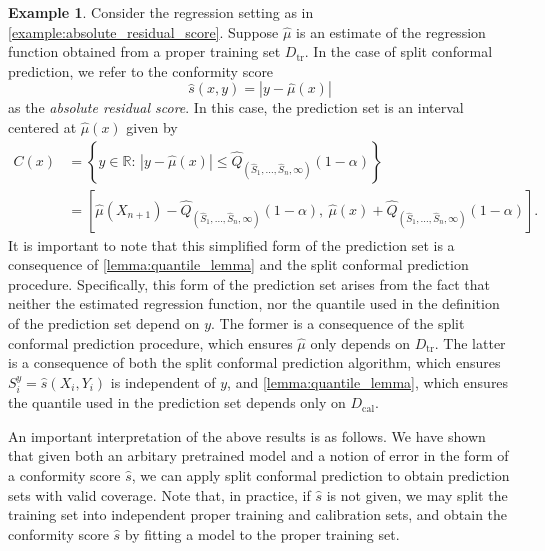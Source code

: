 \documentclass[11pt, titlepage]{article} %
\numberwithin{equation}{section}
\theoremstyle{definition}
\newtheorem{example}{Example}
\numberwithin{theorem}{section}
\numberwithin{lemma}{section}
\numberwithin{corollary}{section}
\numberwithin{proposition}{section}
\numberwithin{definition}{section}
\numberwithin{remark}{section}
\begin{document}
\begin{example}
    Consider the regression setting as in \cref{example:absolute_residual_score}. Suppose \(\hat{\mu}\) is an estimate of the regression function obtained from a proper training set \(D_\mathrm{tr}\). In the case of split conformal prediction, we refer to the conformity score \[\hat{s}(x,y) = |y - \hat{\mu}(x)|\] as the \textit{absolute residual score}. In this case, the prediction set is an interval centered at \(\hat{\mu}(x) \) given by \begin{align}
        C(x) &= \left\{y \in \mathbb{R}: \, |y - \hat{\mu}(x) | \leq \hat{Q}_{(\hat{S}_1, \ldots, \hat{S}_n, \infty)}(1-\alpha) \right\} \nonumber \\
        &= \left[ \hat{\mu}(X_{n+1}) - \hat{Q}_{(\hat{S}_1, \ldots, \hat{S}_n, \infty)}(1-\alpha), \ \hat{\mu}(x) + \hat{Q}_{(\hat{S}_1, \ldots, \hat{S}_n, \infty)}(1-\alpha) \right] \label{eqn:split_absolute_residual_prediction_set}.
    \end{align}
    \noindent
    It is important to note that this simplified form of the prediction set is a consequence of \cref{lemma:quantile_lemma} and the split conformal prediction procedure. Specifically, this form of the prediction set arises from the fact that neither the estimated regression function, nor the quantile used in the definition of the prediction set depend on \(y\). The former is a consequence of the split conformal prediction procedure, which ensures \(\hat{\mu}\) only depends on \(D_\mathrm{tr}\). The latter is a consequence of both the split conformal prediction algorithm, which ensures \(S_i^y = \hat{s}(X_i, Y_i)\) is independent of \(y\), and \cref{lemma:quantile_lemma}, which ensures the quantile used in the prediction set depends only on \(D_\mathrm{cal}\).
    \label{example:splitCP_absolute_residual_score}
\end{example}

\noindent
An important interpretation of the above results is as follows. We have shown that given both an arbitary pretrained model and a notion of error in the form of a conformity score \(\hat{s}\), we can apply split conformal prediction to obtain prediction sets with valid coverage. Note that, in practice, if \(\hat{s}\) is not given, we may split the training set into independent proper training and calibration sets, and obtain the conformity score \(\hat{s}\) by fitting a model to the proper training set. \vskip5pt
\end{document}
